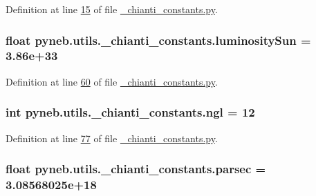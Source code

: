 Definition at line \hyperlink{__chianti__constants_8py_source_l00015}{15} of file \hyperlink{__chianti__constants_8py_source}{\-\_\-chianti\-\_\-constants.\-py}.

\hypertarget{namespacepyneb_1_1utils_1_1__chianti__constants_abc765dba69adeece000b2f7ffed93877}{
\subsubsection[{luminosity\-Sun}]{\setlength{\rightskip}{0pt plus 5cm}float pyneb.\-utils.\-\_\-chianti\-\_\-constants.\-luminosity\-Sun = 3.\-86e+33}}\label{namespacepyneb_1_1utils_1_1__chianti__constants_abc765dba69adeece000b2f7ffed93877}


Definition at line \hyperlink{__chianti__constants_8py_source_l00060}{60} of file \hyperlink{__chianti__constants_8py_source}{\-\_\-chianti\-\_\-constants.\-py}.

\hypertarget{namespacepyneb_1_1utils_1_1__chianti__constants_aa56aafac98ada2bbf340753caef7378f}{
\subsubsection[{ngl}]{\setlength{\rightskip}{0pt plus 5cm}int pyneb.\-utils.\-\_\-chianti\-\_\-constants.\-ngl = 12}}\label{namespacepyneb_1_1utils_1_1__chianti__constants_aa56aafac98ada2bbf340753caef7378f}


Definition at line \hyperlink{__chianti__constants_8py_source_l00077}{77} of file \hyperlink{__chianti__constants_8py_source}{\-\_\-chianti\-\_\-constants.\-py}.

\hypertarget{namespacepyneb_1_1utils_1_1__chianti__constants_abcf6354e4070185098bde01f7ce5c8aa}{
\subsubsection[{parsec}]{\setlength{\rightskip}{0pt plus 5cm}float pyneb.\-utils.\-\_\-chianti\-\_\-constants.\-parsec = 3.\-08568025e+18}}\label{namespacepyneb_1_1utils_1_1__chianti__constants_abcf6354e4070185098bde01f7ce5c8aa}


